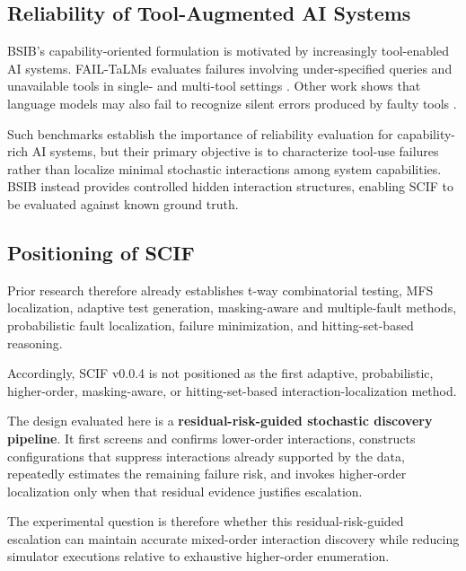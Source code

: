 \subsection{Reliability of Tool-Augmented AI Systems}

BSIB's capability-oriented formulation is motivated by increasingly tool-enabled AI systems. FAIL-TaLMs evaluates failures involving under-specified queries and unavailable tools in single- and multi-tool settings \cite{trevino2025failtalms}. Other work shows that language models may also fail to recognize silent errors produced by faulty tools \cite{sun2024toolsfail}.

Such benchmarks establish the importance of reliability evaluation for capability-rich AI systems, but their primary objective is to characterize tool-use failures rather than localize minimal stochastic interactions among system capabilities. BSIB instead provides controlled hidden interaction structures, enabling SCIF to be evaluated against known ground truth.

\subsection{Positioning of SCIF}

Prior research therefore already establishes t-way combinatorial testing, MFS localization, adaptive test generation, masking-aware and multiple-fault methods, probabilistic fault localization, failure minimization, and hitting-set-based reasoning.

Accordingly, SCIF v0.0.4 is not positioned as the first adaptive, probabilistic, higher-order, masking-aware, or hitting-set-based interaction-localization method.

The design evaluated here is a \textbf{residual-risk-guided stochastic discovery pipeline}. It first screens and confirms lower-order interactions, constructs configurations that suppress interactions already supported by the data, repeatedly estimates the remaining failure risk, and invokes higher-order localization only when that residual evidence justifies escalation.

The experimental question is therefore whether this residual-risk-guided escalation can maintain accurate mixed-order interaction discovery while reducing simulator executions relative to exhaustive higher-order enumeration.
